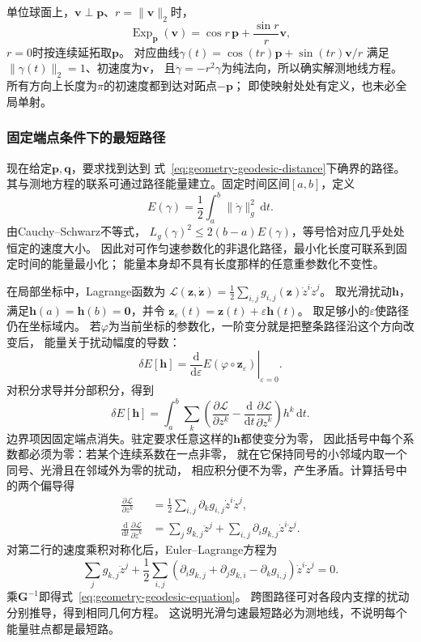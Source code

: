 单位球面上，$\bm v\perp\bm p$、$r=\lVert\bm v\rVert_2$时，
\begin{equation}
 \operatorname{Exp}_{\bm p}(\bm v)
 =\cos r\,\bm p+\frac{\sin r}{r}\bm v,
 \label{eq:geometry-sphere-exponential}
\end{equation}
$r=0$时按连续延拓取$\bm p$。
对应曲线$\gamma(t)=\cos(tr)\bm p+\sin(tr)\bm v/r$
满足$\lVert\gamma(t)\rVert_2=1$、初速度为$\bm v$，
且$\ddot\gamma=-r^2\gamma$为纯法向，所以确实解测地线方程。
所有方向上长度为$\pi$的初速度都到达对跖点$-\bm p$；
即使映射处处有定义，也未必全局单射。

\subsubsection{固定端点条件下的最短路径}
\label{sec:geometry-endpoint-minimizing-path}

现在给定$\bm p,\bm q$，要求找到达到
式~\eqref{eq:geometry-geodesic-distance}下确界的路径。
其与测地方程的联系可通过路径能量建立。固定时间区间$[a,b]$，定义
\[
 E(\gamma)=\frac12\int_a^b\lVert\dot\gamma\rVert_g^2\,\mathrm dt.
\]
由Cauchy--Schwarz不等式，
$L_g(\gamma)^2\leq2(b-a)E(\gamma)$，等号恰对应几乎处处恒定的速度大小。
因此对可作匀速参数化的非退化路径，最小化长度可联系到固定时间的能量最小化；
能量本身却不具有长度那样的任意重参数化不变性。

在局部坐标中，Lagrange函数为
$\mathscr L(\bm z,\dot{\bm z})=\frac12\sum_{i,j}g_{i,j}(\bm z)\dot z^i\dot z^j$。
取光滑扰动$\bm h$，满足$\bm h(a)=\bm h(b)=\bm0$，并令
$\bm z_\varepsilon(t)=\bm z(t)+\varepsilon\bm h(t)$。
取足够小的$\varepsilon$使路径仍在坐标域内。
若$\varphi$为当前坐标的参数化，一阶变分就是把整条路径沿这个方向改变后，
能量关于扰动幅度的导数：
\[
 \delta E[\bm h]
 =\left.\frac{\mathrm d}{\mathrm d\varepsilon}
 E(\varphi\circ\bm z_\varepsilon)\right|_{\varepsilon=0}.
\]
对积分求导并分部积分，得到
\[
 \delta E[\bm h]
 =\int_a^b\sum_k\left(
 \frac{\partial\mathscr L}{\partial z^k}
 -\frac{\mathrm d}{\mathrm dt}
     \frac{\partial\mathscr L}{\partial\dot z^k}\right)h^k\,\mathrm dt.
\]
边界项因固定端点消失。驻定要求任意这样的$\bm h$都使变分为零，
因此括号中每个系数都必须为零：若某个连续系数在一点非零，
就在它保持同号的小邻域内取一个同号、光滑且在邻域外为零的扰动，
相应积分便不为零，产生矛盾。计算括号中的两个偏导得
\[
 \begin{aligned}
 \frac{\partial\mathscr L}{\partial z^k}
   &=\frac12\sum_{i,j}\partial_k g_{i,j}\dot z^i\dot z^j,\\
 \frac{\mathrm d}{\mathrm dt}
    \frac{\partial\mathscr L}{\partial\dot z^k}
   &=\sum_j g_{k,j}\ddot z^j+
     \sum_{i,j}\partial_i g_{k,j}\dot z^i\dot z^j.
 \end{aligned}
\]
对第二行的速度乘积对称化后，Euler--Lagrange方程为
\[
 \sum_jg_{k,j}\ddot z^j+
 \frac12\sum_{i,j}
  (\partial_i g_{k,j}+\partial_j g_{k,i}-\partial_k g_{i,j})
  \dot z^i\dot z^j=0.
\]
乘$\bm G^{-1}$即得式~\eqref{eq:geometry-geodesic-equation}。
跨图路径可对各段内支撑的扰动分别推导，得到相同几何方程。
这说明光滑匀速最短路必为测地线，不说明每个能量驻点都是最短路。

